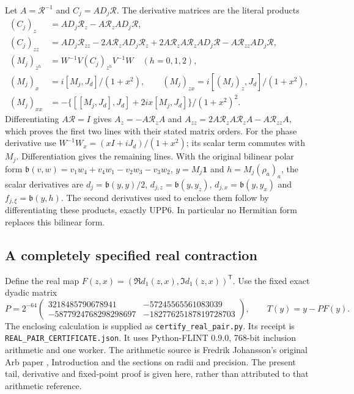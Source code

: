 Let $A=\mathcal R^{-1}$ and $C_j=AD_j\mathcal R$.
The derivative matrices are the literal products
\[
 \begin{aligned}
 (C_j)_z&=AD_j\mathcal R_z-A\mathcal R_zAD_j\mathcal R,\\
 (C_j)_{zz}&=AD_j\mathcal R_{zz}-2A\mathcal R_zAD_j\mathcal R_z
       +2A\mathcal R_zA\mathcal R_zAD_j\mathcal R
       -A\mathcal R_{zz}AD_j\mathcal R,\\
 (M_j)_{z^h}&=W^{-1}V(C_j)_{z^h}V^{-1}W\quad(h=0,1,2),\\
 (M_j)_x&=i[M_j,J_d]/(1+x^2),\qquad
 (M_j)_{zx}=i[(M_j)_z,J_d]/(1+x^2),\\
 (M_j)_{xx}&=-\{[[M_j,J_d],J_d]+2ix[M_j,J_d]\}/(1+x^2)^2.
 \end{aligned}\tag{RPZ9}
\]
Differentiating $A\mathcal R=I$ gives
$A_z=-A\mathcal R_zA$ and
$A_{zz}=2A\mathcal R_zA\mathcal R_zA-A\mathcal R_{zz}A$,
which proves the first two lines with their stated matrix orders.
For the phase derivative use
$W^{-1}W_x=(xI+iJ_d)/(1+x^2)$; its scalar term commutes with
$M_j$. Differentiation gives the remaining lines. With the original
bilinear polar form
$\mathfrak b(v,w)=v_1w_4+v_4w_1-v_2w_3-v_3w_2$,
$y=M_j\boldsymbol1$ and $h=M_j(\rho_a)_a$, the scalar derivatives
are $d_j=\mathfrak b(y,y)/2$,
$d_{j,z}=\mathfrak b(y,y_z)$,
$d_{j,x}=\mathfrak b(y,y_x)$ and
$f_{j,\xi}=\mathfrak b(y,h)$. The second derivatives used to
enclose them follow by differentiating these products, exactly
UPP6. In particular no Hermitian form replaces this bilinear form.

\subsection{A completely specified real contraction}
Define the real map $F(z,x)=(\Re d_1(z,x),\Im d_1(z,x))^{\mathsf T}$.
Use the fixed exact dyadic matrix
\[
 P=2^{-64}\begin{pmatrix}
 3218485790678941&-57245565561083039\\
 -5877924768298298697&-18277625187819728703
 \end{pmatrix},\qquad T(y)=y-PF(y).\tag{RPZ10}
\]
The enclosing calculation is supplied as
\nolinkurl{certify_real_pair.py}.
Its receipt is \nolinkurl{REAL_PAIR_CERTIFICATE.json}.
It uses Python-FLINT 0.9.0,
768-bit inclusion arithmetic and one worker. The arithmetic source
is Fredrik Johansson's original Arb paper \cite{human:arb2016},
Introduction and the sections on radii and precision. The present
tail, derivative and fixed-point proof is given here, rather than
attributed to that arithmetic reference.

